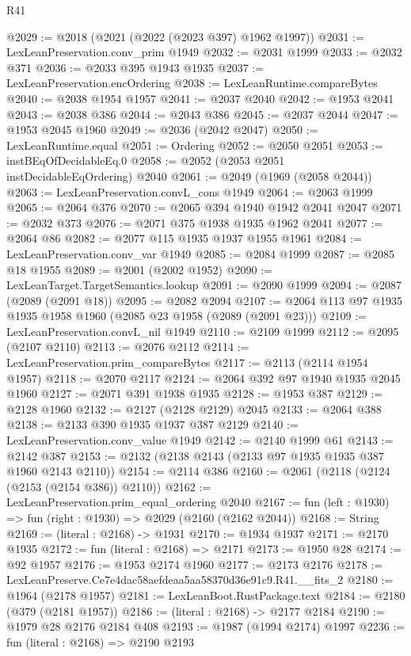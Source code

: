 \begin{lexlean}{R41}
\begin{coremodule}
@2029 := @2018 (@2021 (@2022 (@2023 @397) @1962 @1997))
@2031 := LexLeanPreservation.conv_prim @1949
@2032 := @2031 @1999
@2033 := @2032 @371
@2036 := @2033 @395 @1943 @1935
@2037 := LexLeanPreservation.encOrdering
@2038 := LexLeanRuntime.compareBytes
@2040 := @2038 @1954 @1957
@2041 := @2037 @2040
@2042 := @1953 @2041
@2043 := @2038 @386
@2044 := @2043 @386
@2045 := @2037 @2044
@2047 := @1953 @2045 @1960
@2049 := @2036 (@2042 @2047)
@2050 := LexLeanRuntime.equal
@2051 := Ordering
@2052 := @2050 @2051
@2053 := instBEqOfDecidableEq.{0}
@2058 := @2052 (@2053 @2051 instDecidableEqOrdering) @2040
@2061 := @2049 (@1969 (@2058 @2044))
@2063 := LexLeanPreservation.convL_cons @1949
@2064 := @2063 @1999
@2065 := @2064 @376
@2070 := @2065 @394 @1940 @1942 @2041 @2047
@2071 := @2032 @373
@2076 := @2071 @375 @1938 @1935 @1962 @2041
@2077 := @2064 @86
@2082 := @2077 @115 @1935 @1937 @1955 @1961
@2084 := LexLeanPreservation.conv_var @1949
@2085 := @2084 @1999
@2087 := @2085 @18 @1955
@2089 := @2001 (@2002 @1952)
@2090 := LexLeanTarget.TargetSemantics.lookup
@2091 := @2090 @1999
@2094 := @2087 (@2089 (@2091 @18))
@2095 := @2082 @2094
@2107 := @2064 @113 @97 @1935 @1935 @1958 @1960 (@2085 @23 @1958 (@2089 (@2091 @23)))
@2109 := LexLeanPreservation.convL_nil @1949
@2110 := @2109 @1999
@2112 := @2095 (@2107 @2110)
@2113 := @2076 @2112
@2114 := LexLeanPreservation.prim_compareBytes
@2117 := @2113 (@2114 @1954 @1957)
@2118 := @2070 @2117
@2124 := @2064 @392 @97 @1940 @1935 @2045 @1960
@2127 := @2071 @391 @1938 @1935
@2128 := @1953 @387
@2129 := @2128 @1960
@2132 := @2127 (@2128 @2129) @2045
@2133 := @2064 @388
@2138 := @2133 @390 @1935 @1937 @387 @2129
@2140 := LexLeanPreservation.conv_value @1949
@2142 := @2140 @1999 @61
@2143 := @2142 @387
@2153 := @2132 (@2138 @2143 (@2133 @97 @1935 @1935 @387 @1960 @2143 @2110))
@2154 := @2114 @386
@2160 := @2061 (@2118 (@2124 (@2153 (@2154 @386)) @2110))
@2162 := LexLeanPreservation.prim_equal_ordering @2040
@2167 := fun (left : @1930) => fun (right : @1930) => @2029 (@2160 (@2162 @2044))
@2168 := String
@2169 := (literal : @2168) -> @1931
@2170 := @1934 @1937
@2171 := @2170 @1935
@2172 := fun (literal : @2168) => @2171
@2173 := @1950 @28
@2174 := @92 @1957
@2176 := @1953 @2174 @1960
@2177 := @2173 @2176
@2178 := LexLeanPreserve.Ce7e4dac58aefdeaa5aa58370d36e91c9.R41.__fits_2
@2180 := @1964 (@2178 @1957)
@2181 := LexLeanBoot.RustPackage.text
@2184 := @2180 (@379 (@2181 @1957))
@2186 := (literal : @2168) -> @2177 @2184
@2190 := @1979 @28 @2176 @2184 @408
@2193 := @1987 (@1994 @2174) @1997
@2236 := fun (literal : @2168) =>
  @2190
    @2193

\end{coremodule}
\end{lexlean}
